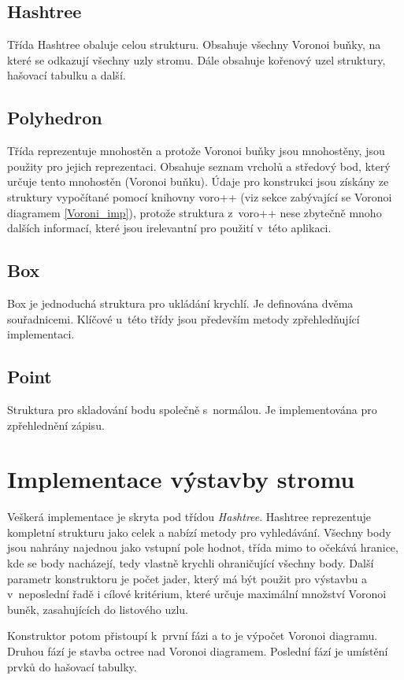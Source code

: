 \subsection*{Hashtree}
Třída Hashtree obaluje celou strukturu. Obsahuje všechny Voronoi buňky, na které se odkazují všechny uzly stromu. Dále obsahuje kořenový uzel struktury, hašovací tabulku a další.

\subsection*{Polyhedron}
Třída reprezentuje mnohostěn a protože Voronoi buňky jsou mnohostěny, jsou použity pro jejich reprezentaci. Obsahuje seznam vrcholů a středový bod, který určuje tento mnohostěn (Voronoi buňku). Údaje pro konstrukci jsou získány ze struktury vypočítané pomocí knihovny voro++ (viz sekce zabývající se Voronoi diagramem \ref{Voroni_imp}), protože struktura z~voro++ nese zbytečně mnoho dalších informací, které jsou irelevantní pro použití v~této aplikaci.

\subsection*{Box}
Box je jednoduchá struktura pro ukládání krychlí. Je definována dvěma souřadnicemi. Klíčové u~této třídy jsou především metody zpřehledňující implementaci.

\subsection*{Point}
Struktura pro skladování bodu společně s~normálou. Je implementována pro zpřehlednění zápisu.

\section{Implementace výstavby stromu}
Veškerá implementace je skryta pod třídou \emph{Hashtree}. Hashtree reprezentuje kompletní strukturu jako celek a nabízí metody pro vyhledávání. Všechny body jsou nahrány najednou jako vstupní pole hodnot, třída mimo to očekává hranice, kde se body nacházejí, tedy vlastně krychli ohraničující všechny body. Další parametr konstruktoru je počet jader, který má být použit pro výstavbu a v~neposlední řadě i cílové kritérium, které určuje maximální množství Voronoi buněk, zasahujících do listového uzlu.

Konstruktor potom přistoupí k~první fázi a to je výpočet Voronoi diagramu. Druhou fází je stavba octree nad Voronoi diagramem. Poslední fází je umístění prvků do hašovací tabulky.


